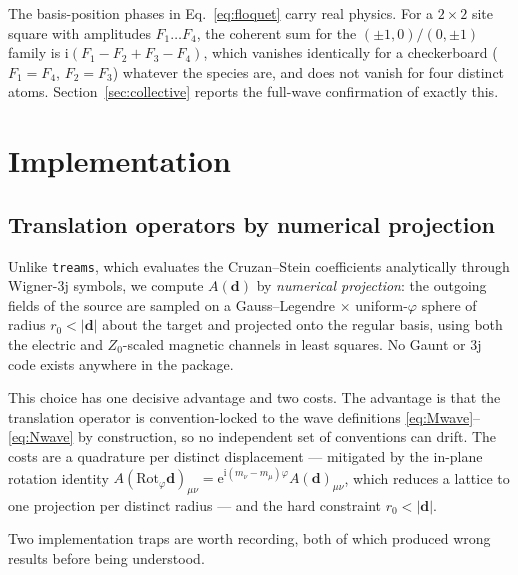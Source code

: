 \documentclass[11pt,a4paper]{article}
\theoremstyle{plain}
\theoremstyle{definition}
\begin{document}
The basis-position phases in Eq.~\eqref{eq:floquet} carry real physics. For a
$2\times2$ site square with amplitudes $F_1 \dots F_4$, the coherent sum for the
$(\pm1,0)/(0,\pm1)$ family is $\mathrm{i}(F_1 - F_2 + F_3 - F_4)$, which vanishes
identically for a checkerboard ($F_1 = F_4$, $F_2 = F_3$) whatever the species
are, and does not vanish for four distinct atoms. Section~\ref{sec:collective}
reports the full-wave confirmation of exactly this.

\section{Implementation}
\label{sec:impl}

\subsection{Translation operators by numerical projection}

Unlike \texttt{treams}, which evaluates the Cruzan--Stein coefficients
analytically through Wigner-3j symbols, we compute $A(\mathbf{d})$ by
\emph{numerical projection}: the outgoing fields of the source are sampled on a
Gauss--Legendre$\,\times\,$uniform-$\varphi$ sphere of radius $r_0 < |\mathbf{d}|$
about the target and projected onto the regular basis, using both the electric
and $Z_0$-scaled magnetic channels in least squares. No Gaunt or 3j code exists
anywhere in the package.

This choice has one decisive advantage and two costs. The advantage is that the
translation operator is convention-locked to the wave definitions
\eqref{eq:Mwave}--\eqref{eq:Nwave} by construction, so no independent set of
conventions can drift. The costs are a quadrature per distinct displacement ---
mitigated by the in-plane rotation identity
$A(\mathrm{Rot}_\varphi\mathbf{d})_{\mu\nu} =
\mathrm{e}^{\mathrm{i}(m_\nu - m_\mu)\varphi} A(\mathbf{d})_{\mu\nu}$, which
reduces a lattice to one projection per distinct radius --- and the hard
constraint $r_0 < |\mathbf{d}|$.

Two implementation traps are worth recording, both of which produced wrong
results before being understood.
\end{document}
